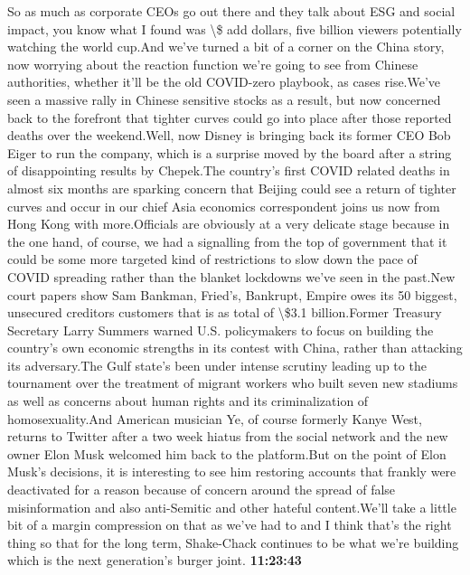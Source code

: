 \documentclass{article}%
\begin{document}
So as much as corporate CEOs go out there and they talk about ESG and social impact, you know what I found was \textbackslash{}\$ add dollars, five billion viewers potentially watching the world cup.And we've turned a bit of a corner on the China story, now worrying about the reaction function we're going to see from Chinese authorities, whether it'll be the old COVID{-}zero playbook, as cases rise.We've seen a massive rally in Chinese sensitive stocks as a result, but now concerned back to the forefront that tighter curves could go into place after those reported deaths over the weekend.Well, now Disney is bringing back its former CEO Bob Eiger to run the company, which is a surprise moved by the board after a string of disappointing results by Chepek.The country's first COVID related deaths in almost six months are sparking concern that Beijing could see a return of tighter curves and occur in our chief Asia economics correspondent joins us now from Hong Kong with more.Officials are obviously at a very delicate stage because in the one hand, of course, we had a signalling from the top of government that it could be some more targeted kind of restrictions to slow down the pace of COVID spreading rather than the blanket lockdowns we've seen in the past.New court papers show Sam Bankman, Fried's, Bankrupt, Empire owes its 50 biggest, unsecured creditors customers that is as total of \textbackslash{}\$3.1 billion.Former Treasury Secretary Larry Summers warned U.S. policymakers to focus on building the country's own economic strengths in its contest with China, rather than attacking its adversary.The Gulf state's been under intense scrutiny leading up to the tournament over the treatment of migrant workers who built seven new stadiums as well as concerns about human rights and its criminalization of homosexuality.And American musician Ye, of course formerly Kanye West, returns to Twitter after a two week hiatus from the social network and the new owner Elon Musk welcomed him back to the platform.But on the point of Elon Musk's decisions, it is interesting to see him restoring accounts that frankly were deactivated for a reason because of concern around the spread of false misinformation and also anti{-}Semitic and other hateful content.We'll take a little bit of a margin compression on that as we've had to and I think that's the right thing so that for the long term, Shake{-}Chack continues to be what we're building which is the next generation's burger joint.%
\textbf{11:23:43}%
\newline%
\end{document}
